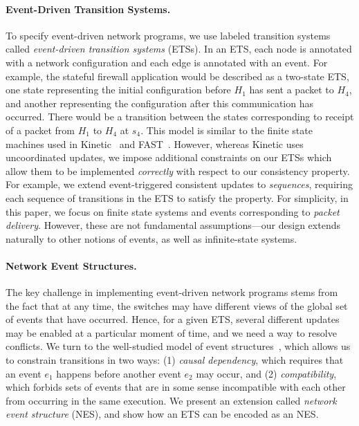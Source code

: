 \documentclass[pldi-cameraready]{sigplanconf}
\begin{document}
\paragraph*{Event-Driven Transition Systems.}
To specify event-driven network programs, we use labeled
transition systems called {\em event-driven transition systems} (ETSs). In
an ETS, each node is annotated with a network configuration and each
edge is annotated with an event. For example, the stateful
firewall application would be described as a two-state ETS,
one state representing the initial configuration before
$H_1$ has sent a packet to $H_4$, and another representing the
configuration after this communication has occurred. There would be a
transition between the states corresponding to receipt of a packet from $H_1$ to
$H_4$ at $s_4$. This model is similar to the finite state machines
used in Kinetic~\cite{kim2015kinetic} and FAST~\cite{moshref2014flow}.
However, whereas Kinetic uses uncoordinated updates,
we impose additional constraints on our ETSs which allow 
them to be implemented {\em correctly} with respect to
our consistency property. For example, we extend event-triggered
consistent updates to {\em sequences}, requiring each sequence of transitions in
the ETS to satisfy the property.
For simplicity, in this paper, we focus on finite state systems and events
corresponding to {\em packet delivery}. However, these are
not fundamental assumptions---our design extends naturally to other
notions of events, as well as infinite-state systems.

\paragraph*{Network Event Structures.}
The key challenge in implementing event-driven network programs
stems from the fact that at any time, the switches may have
different views of the global set of events that have occurred.
Hence, for a given ETS, several different updates may be
enabled at a particular moment of time, and we need a way to resolve
conflicts. We turn to the well-studied model of event
structures~\cite{winskel1987event}, which allows us to constrain transitions in two ways:
(1) {\em causal dependency}, which requires that an event $e_1$
happens before another event $e_2$ may occur, and (2) {\em compatibility},
which forbids sets of events that are in some sense
incompatible with each other from occurring in the same execution.
We present an extension called {\em network event structure} (NES), and
show how an ETS can be encoded as an NES.
\end{document}
